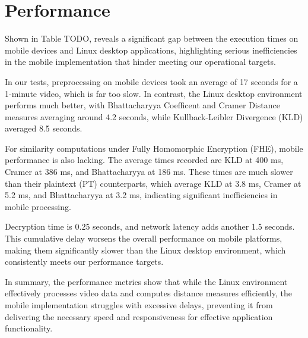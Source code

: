 \section{Performance}
Shown in Table TODO, reveals a significant gap between the execution times on mobile devices and Linux desktop applications, highlighting serious inefficiencies in the mobile implementation that hinder meeting our operational targets.

In our tests, preprocessing on mobile devices took an average of 17 seconds for a 1-minute video, which is far too slow. In contrast, the Linux desktop environment performs much better, with Bhattacharyya Coefficent and Cramer Distance measures averaging around 4.2 seconds, while Kullback-Leibler Divergence (KLD) averaged 8.5 seconds.

For similarity computations under Fully Homomorphic Encryption (FHE), mobile performance is also lacking. The average times recorded are KLD at 400 ms, Cramer at 386 ms, and Bhattacharyya at 186 ms. These times are much slower than their plaintext (PT) counterparts, which average KLD at 3.8 ms, Cramer at 5.2 ms, and Bhattacharyya at 3.2 ms, indicating significant inefficiencies in mobile processing.

Decryption time is 0.25 seconds, and network latency adds another 1.5 seconds. This cumulative delay worsens the overall performance on mobile platforms, making them significantly slower than the Linux desktop environment, which consistently meets our performance targets.

In summary, the performance metrics show that while the Linux environment effectively processes video data and computes distance measures efficiently, the mobile implementation struggles with excessive delays, preventing it from delivering the necessary speed and responsiveness for effective application functionality.
